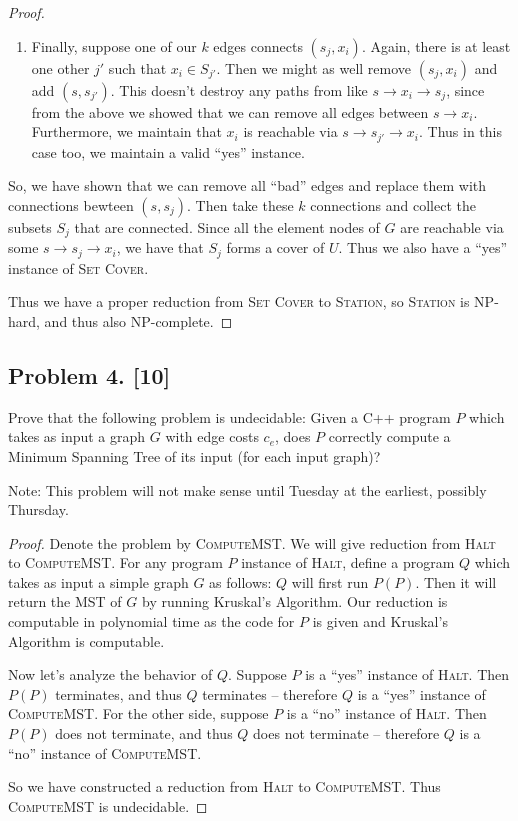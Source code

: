 \documentclass[10pt]{article}
\begin{document}
\begin{proof}
\begin{enumerate}
    \item Finally, suppose one of our \(k\) edges connects \((s_j, x_i)\). Again, there is at least one other \(j'\) such that \(x_i \in S_{j'}\). Then we might as well remove \((s_j, x_i)\) and add \((s, s_{j'})\). This doesn't destroy any paths from like \(s \to x_i \to s_j\), since from the above we showed that we can remove all edges between \(s \to x_i\). Furthermore, we maintain that \(x_i\) is reachable via \(s \to s_{j'} \to x_i\). Thus in this case too, we maintain a valid ``yes'' instance.
  \end{enumerate}

  So, we have shown that we can remove all ``bad'' edges and replace them with connections bewteen \((s, s_j)\). Then take these \(k\) connections and collect the subsets \(S_j\) that are connected. Since all the element nodes of \(G\) are reachable via some \(s \to s_j \to x_i\), we have that \(S_j\) forms a cover of \(U\). Thus we also have a ``yes'' instance of \textsc{Set Cover}. 
  
  Thus we have a proper reduction from \textsc{Set Cover} to \textsc{Station}, so \textsc{Station} is NP-hard, and thus also NP-complete.
\end{proof}

\subsection*{Problem 4. [10]}
  Prove that the following problem is undecidable: Given a C++ program $P$ which takes as input a graph $G$ with edge costs $c_e$, does $P$ correctly compute a Minimum Spanning Tree of its input (for each input graph)?

  Note: This problem will not make sense until Tuesday at the earliest, possibly Thursday.

\begin{proof}
  Denote the problem by \textsc{ComputeMST}. We will give  reduction from \textsc{Halt} to \textsc{ComputeMST}. For any program \(P\) instance of \textsc{Halt}, define a program \(Q\) which takes as input a simple graph \(G\) as follows: \(Q\) will first run \(P(P)\). Then it will return the MST of \(G\) by running Kruskal's Algorithm. Our reduction is computable in polynomial time as the code for \(P\) is given and Kruskal's Algorithm is computable.

  Now let's analyze the behavior of \(Q\). Suppose \(P\) is a ``yes'' instance of \textsc{Halt}. Then \(P(P)\) terminates, and thus \(Q\) terminates -- therefore \(Q\) is a ``yes'' instance of \textsc{ComputeMST}. For the other side, suppose \(P\) is a ``no'' instance of \textsc{Halt}. Then \(P(P)\) does not terminate, and thus \(Q\) does not terminate -- therefore \(Q\) is a ``no'' instance of \textsc{ComputeMST}.

  So we have constructed a reduction from \textsc{Halt} to \textsc{ComputeMST}. Thus \textsc{ComputeMST} is undecidable.
\end{proof}
\end{document}
